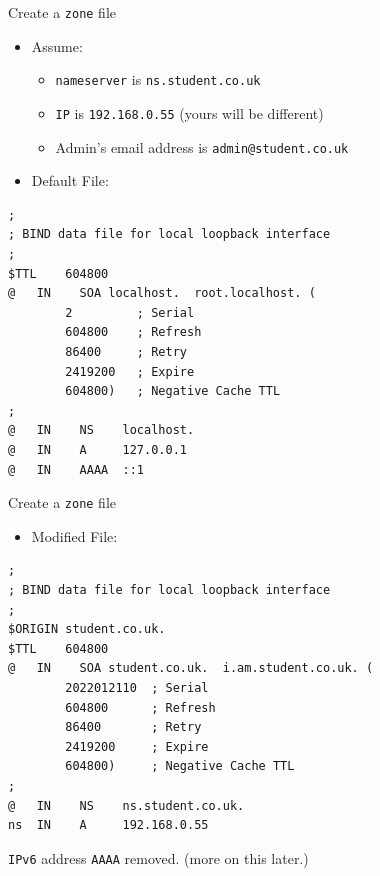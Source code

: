 \documentclass[aspectratio=169,xcolor=table]{beamer}
\begin{document}
\begin{frame}[fragile]{Create a \texttt{zone} file}
  \begin{itemize}
    \item Assume:
      \begin{itemize}
        \item \texttt{nameserver} is \texttt{ns.student.co.uk}
        \item \texttt{IP} is \texttt{192.168.0.55} (yours will be different)
        \item Admin's email address is \texttt{admin@student.co.uk}
      \end{itemize}
  \end{itemize}
  \begin{itemize}
    \item Default File:
  \end{itemize}
  \lstset{
    basicstyle=\tiny\ttfamily,
  }
  \begin{lstlisting}
;
; BIND data file for local loopback interface
;
$TTL    604800
@   IN    SOA localhost.  root.localhost. (
        2         ; Serial
        604800    ; Refresh
        86400     ; Retry
        2419200   ; Expire
        604800)   ; Negative Cache TTL
;
@   IN    NS    localhost.
@   IN    A     127.0.0.1
@   IN    AAAA  ::1
  \end{lstlisting}
\end{frame}

\begin{frame}[fragile]{Create a \texttt{zone} file}
  \begin{itemize}
    \item Modified File:
  \end{itemize}
  \lstset{
    basicstyle=\tiny\ttfamily,
  }
  \begin{lstlisting}
;
; BIND data file for local loopback interface
;
$ORIGIN student.co.uk.
$TTL    604800
@   IN    SOA student.co.uk.  i.am.student.co.uk. (
        2022012110  ; Serial
        604800      ; Refresh
        86400       ; Retry
        2419200     ; Expire
        604800)     ; Negative Cache TTL
;
@   IN    NS    ns.student.co.uk.
ns  IN    A     192.168.0.55
  \end{lstlisting}
  \begin{tcolorbox}[title={\textbf{NOTE:}}]
    \texttt{IPv6} address \texttt{AAAA} removed. (more on this later.)
  \end{tcolorbox}
\end{frame}
\end{document}

